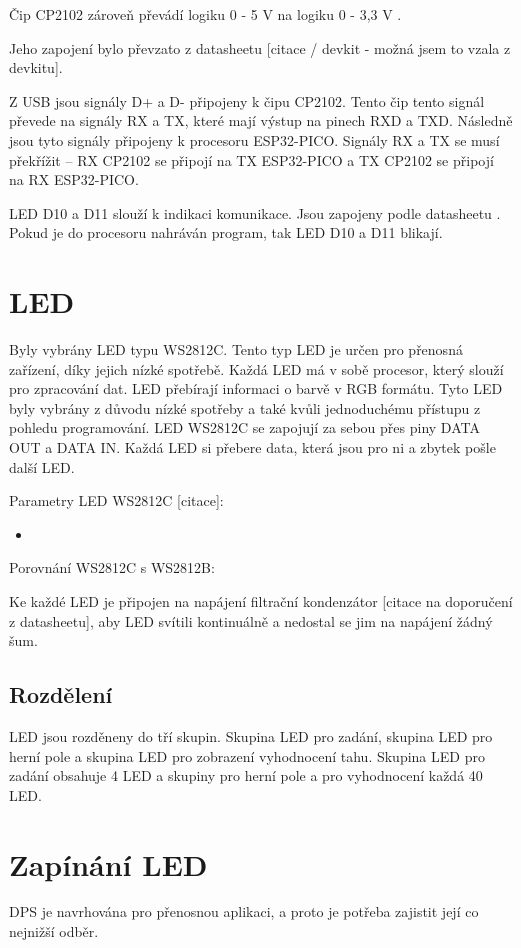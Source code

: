 Čip CP2102 zároveň převádí logiku 0 - 5 V na logiku 0 - 3,3 V \cite{CP2102_datasheet}.

Jeho zapojení bylo převzato z datasheetu [citace / devkit - možná jsem to vzala z devkitu].

Z USB jsou signály D+ a D- připojeny k čipu CP2102. Tento čip tento signál převede na signály RX a TX, které mají výstup 
na pinech RXD a TXD. Následně jsou tyto signály připojeny k procesoru ESP32-PICO. Signály RX a TX se musí překřížit – RX 
CP2102 se připojí na TX ESP32-PICO a TX CP2102 se připojí na RX ESP32-PICO. 

LED D10 a D11 slouží k indikaci komunikace. Jsou zapojeny podle datasheetu \cite{CP2102_datasheet}. Pokud je do procesoru 
nahráván program, tak LED D10 a D11 blikají.

\section{LED}
Byly vybrány LED typu WS2812C. Tento typ LED je určen pro přenosná zařízení, díky jejich nízké spotřebě. Každá LED 
má v sobě procesor, který slouží pro zpracování dat. LED přebírají informaci o barvě v RGB formátu. 
Tyto LED byly vybrány z důvodu nízké spotřeby a také kvůli jednoduchému přístupu z pohledu programování.
LED WS2812C se zapojují za sebou přes piny DATA OUT a DATA IN. Každá LED si přebere data, která jsou pro ni a zbytek 
pošle další LED.

Parametry LED WS2812C [citace]: %
\begin{itemize}
    \item 
\end{itemize}

Porovnání WS2812C s WS2812B:

Ke každé LED je připojen na napájení filtrační kondenzátor [citace na doporučení z datasheetu], aby LED svítili kontinuálně 
a nedostal se jim na napájení žádný šum.

\subsection{Rozdělení}
LED jsou rozděneny do tří skupin. Skupina LED pro zadání, skupina LED pro herní pole a skupina LED pro zobrazení vyhodnocení 
tahu.
Skupina LED pro zadání obsahuje 4 LED a skupiny pro herní pole a pro vyhodnocení každá 40 LED.

\section{Zapínání LED}
DPS je navrhována pro přenosnou aplikaci, a proto je potřeba zajistit její co nejnižší odběr. 

